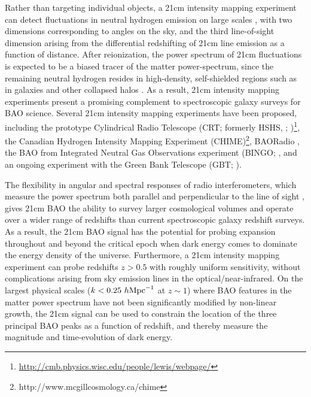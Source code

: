 \documentclass[10pt,iop]{emulateapj}
\begin{document}
Rather than targeting individual objects, a 21cm intensity mapping
experiment can detect fluctuations in neutral hydrogen emission on large scales
\citep{chang_et_al_2008,wyithe_et_al_2008,morales_and_wyithe_2010,pritchard_and_loeb_2011},
with two dimensions corresponding to angles
on the sky, and the third line-of-sight dimension arising from the differential 
redshifting of 21cm line emission as a function of distance.
After reionization, the power spectrum of 21cm fluctuations is expected to be a biased tracer of the matter power-spectrum,
since the remaining neutral hydrogen resides in
high-density, self-shielded regions such as in galaxies and other collapsed halos
\citep{barkana_and_loeb_2007,madau_et_al_1997}.  As a result, 
21cm intensity mapping experiments
present a promising complement to spectroscopic galaxy surveys
for BAO science.  Several 21cm intensity mapping experiments have been proposed,
including the prototype Cylindrical Radio Telescope (CRT; formerly HSHS, 
\citealt{peterson_et_al_2006}; \citealt{seo_et_al_2010})\footnote{\url{http://cmb.physics.wisc.edu/people/lewis/webpage/}},
the Canadian Hydrogen Intensity Mapping Experiment (CHIME)\footnote{http://www.mcgillcosmology.ca/chime},
BAORadio \citep{ansari_et_al_2012a,ansari_et_al_2012b}, 
the BAO from Integrated Neutral Gas Observations experiment (BINGO; \citealt{battye_et_al_2012},
and an ongoing experiment with the Green Bank
Telescope (GBT; \citealt{chang_et_al_2010}).  

The flexibility in angular and spectral responses of radio interferometers,
which measure the power spectrum both parallel and perpendicular to
the line of sight \citep{morales_2005},
gives 21cm BAO the ability to survey larger cosmological volumes and operate over
a wider range of redshifts than current spectroscopic galaxy redshift surveys.
As a result, the 21cm BAO signal has the potential for probing expansion throughout
and beyond
the critical epoch when dark energy comes to dominate the energy density of the
universe.
Furthermore, a 21cm intensity mapping experiment can probe redshifts $z > 0.5$ 
with roughly uniform sensitivity,
without complications arising from sky emission lines in the optical/near-infrared.
On the largest physical scales ($k<0.25~h{\rm Mpc}^{-1}$ at $z\sim 1$) where BAO
features in the matter power spectrum have not been significantly modified by
non-linear growth, the 21cm signal can be used to constrain the location of the
three principal BAO peaks as a function of redshift, and thereby measure
the magnitude and time-evolution of dark energy.
\end{document}
